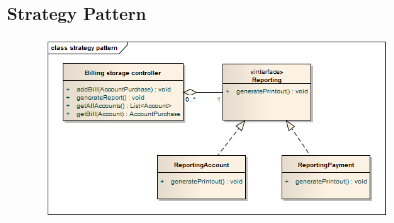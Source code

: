 

\subsubsection{Strategy Pattern}
\begin{figure}[H]
 \centering
 \includegraphics[width=0.8\textwidth]{../strategyPattern.png}
\end{figure}




